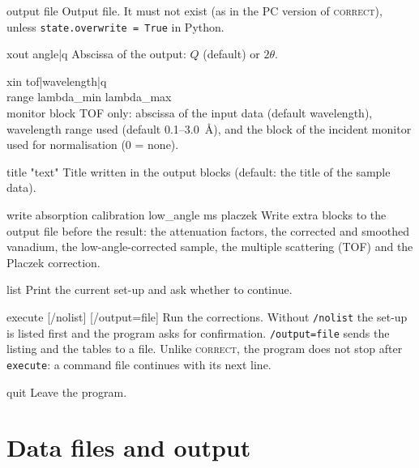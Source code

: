 \documentclass[11pt,a4paper]{report}
\newcommand{\cmd}[1]{\texttt{\color{accent}#1}}
\newcommand{\code}[1]{\texttt{#1}}
\newcommand{\cor}{\textsc{correct}}
\begin{document}
\begin{cmdbox}{output  file}
Output file. It must not exist (as in the PC version of \cor), unless
\code{state.overwrite = True} in Python.
\end{cmdbox}

\begin{cmdbox}{xout  angle|q}
Abscissa of the output: $Q$ (default) or $2\theta$.
\end{cmdbox}

\begin{cmdbox}{xin  tof|wavelength|q\\ range  lambda\_min  lambda\_max\\ monitor  block}
TOF only: abscissa of the input data (default wavelength), wavelength range
used (default 0.1--3.0~\AA), and the block of the incident monitor used for
normalisation (0 = none).
\end{cmdbox}

\begin{cmdbox}{title  "text"}
Title written in the output blocks (default: the title of the sample data).
\end{cmdbox}

\begin{cmdbox}{write  absorption  calibration  low\_angle  ms  placzek}
Write extra blocks to the output file before the result: the attenuation
factors, the corrected and smoothed vanadium, the low-angle-corrected sample,
the multiple scattering (TOF) and the Placzek correction.
\end{cmdbox}

\begin{cmdbox}{list}
Print the current set-up and ask whether to continue.
\end{cmdbox}

\begin{cmdbox}{execute  [/nolist]  [/output=file]}
Run the corrections. Without \code{/nolist} the set-up is listed first and the
program asks for confirmation. \code{/output=file} sends the listing and the
tables to a file. Unlike \cor, the program does not stop after \cmd{execute}: a
command file continues with its next line.
\end{cmdbox}

\begin{cmdbox}{quit}
Leave the program.
\end{cmdbox}

\chapter{Data files and output}
\label{chap:files}
\end{document}
